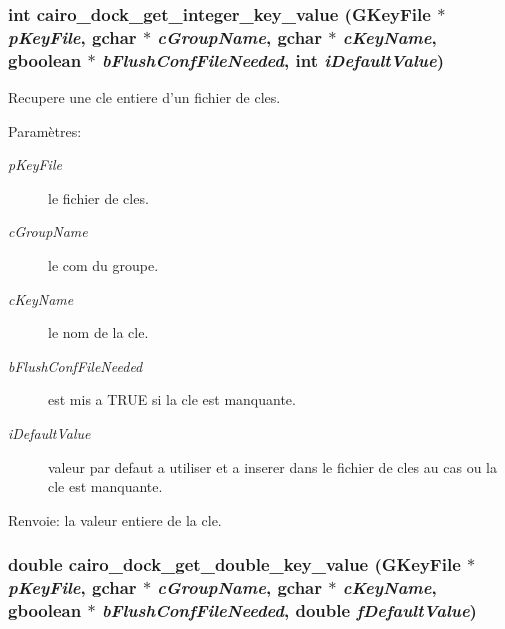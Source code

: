 \subsubsection{\setlength{\rightskip}{0pt plus 5cm}int cairo\_\-dock\_\-get\_\-integer\_\-key\_\-value (GKey\-File $\ast$ {\em p\-Key\-File}, gchar $\ast$ {\em c\-Group\-Name}, gchar $\ast$ {\em c\-Key\-Name}, gboolean $\ast$ {\em b\-Flush\-Conf\-File\-Needed}, int {\em i\-Default\-Value})}\label{cairo-dock-config_8c_5ed21435bb2a71a53413df26e0efe77e}


Recupere une cle entiere d'un fichier de cles. \begin{Desc}
\item[Param\`{e}tres:]
\begin{description}
\item[{\em p\-Key\-File}]le fichier de cles. \item[{\em c\-Group\-Name}]le com du groupe. \item[{\em c\-Key\-Name}]le nom de la cle. \item[{\em b\-Flush\-Conf\-File\-Needed}]est mis a TRUE si la cle est manquante. \item[{\em i\-Default\-Value}]valeur par defaut a utiliser et a inserer dans le fichier de cles au cas ou la cle est manquante. \end{description}
\end{Desc}
\begin{Desc}
\item[Renvoie:]la valeur entiere de la cle. \end{Desc}
\subsubsection{\setlength{\rightskip}{0pt plus 5cm}double cairo\_\-dock\_\-get\_\-double\_\-key\_\-value (GKey\-File $\ast$ {\em p\-Key\-File}, gchar $\ast$ {\em c\-Group\-Name}, gchar $\ast$ {\em c\-Key\-Name}, gboolean $\ast$ {\em b\-Flush\-Conf\-File\-Needed}, double {\em f\-Default\-Value})}\label{cairo-dock-config_8c_db8d7432ccf93682ccc4b20f7f40c25c}


